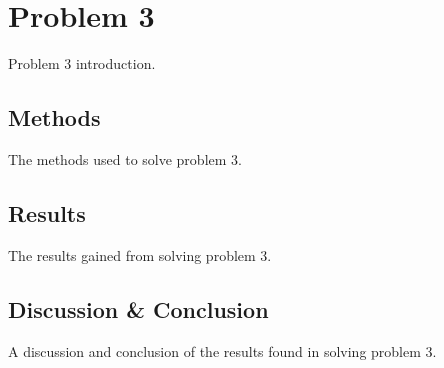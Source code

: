 \chapter{Problem 3}\label{ch:3-in-hand-manipulation}

Problem 3 introduction.

\section{Methods}\label{sec:1-tactile-perception-method}

The methods used to solve problem 3.

\section{Results}\label{sec:1-tactile-perception-results}

The results gained from solving problem 3.

\section{Discussion \& Conclusion}\label{sec:1-tactile-perception-discussion-and-conclusion}

A discussion and conclusion of the results found in solving problem 3.